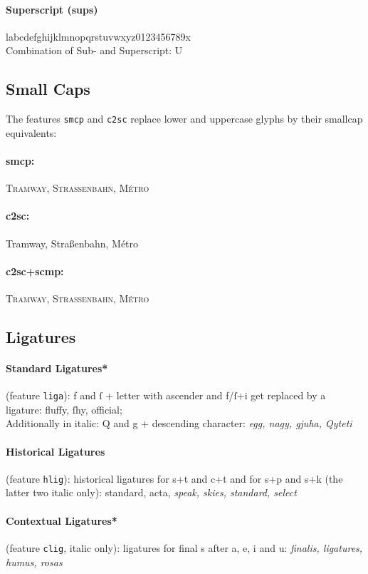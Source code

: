 \documentclass[pagesize,DIV14]{scrartcl}
\begin{document}
\paragraph*{Superscript (sups)} l{abcdefghijklmnopqrstuvwxyz0123456789}x
\\
\setlength\subsupersep{1pt}
Combination of Sub- and Superscript: U
\subsection{Small Caps}
The features \texttt{smcp} and \texttt{c2sc} replace lower and uppercase glyphs by their smallcap equivalents:
\paragraph*{smcp:} \textsc{Tramway, Straßenbahn, Métro}
\paragraph*{c2sc:} {Tramway, Straßenbahn, Métro}
\paragraph*{c2sc+scmp:} \textsc{Tramway, Straßenbahn, Métro}

\subsection{Ligatures}
\paragraph*{Standard Ligatures*} (feature \texttt{liga}): f and ſ + letter with ascender and f/ſ+i get replaced by a ligature: fluffy, ſhy, official;\\
Additionally in italic: Q and g + descending character: \textit{egg, nagy, gjuha, Qyteti} 
\paragraph*{Historical Ligatures} (feature \texttt{hlig}): historical ligatures for s+t and c+t and for s+p and s+k (the latter two italic only): {standard, acta, \textit{speak, skies, standard, select}}
\paragraph*{Contextual Ligatures*} (feature \texttt{clig}, italic only): ligatures for final s after a, e, i and u: \textit{%
finalis, ligatures, humus, rosas}
\end{document}
